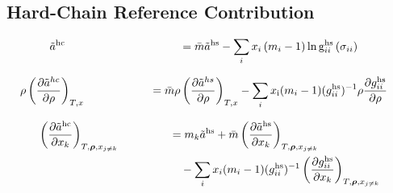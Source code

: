 \documentclass[12pt, letterpaper]{article}
\begin{document}
\subsection{Hard-Chain Reference Contribution}


\begin{equation}
    \begin{aligned}
        \mathmakebox[11.5em][l]{\tilde{a}^{\mathrm{hc}}}
        &=
        \bar{m} \tilde{a}^{\mathrm{hs}}
        -\sum_{i} x_{i}\left(m_{i}-1\right) \ln \mathrm{g}_{i i}^{\mathrm{hs}}\left(\sigma_{i i}\right)
    \end{aligned}
    \label{eq:ares_hc}
\end{equation}



\begin{equation}
    \begin{aligned}
        \mathmakebox[11.5em][l]{\rho\left(\frac{\partial\tilde{a}^{hc}}{\partial\rho}\right)_{T,x}}
        &=
        \bar{m}\rho\left(\frac{\partial\tilde{a}^{hs}}{\partial\rho}\right)_{T,x}
        -\sum_{i}x_{\mathrm{i}}(m_{i}-1)(g_{ii}^\mathrm{hs})^{-1}\rho\frac{\partial g_{ii}^\mathrm{hs}}{\partial\rho}
    \end{aligned}
    \label{eq:hc_ares_dadrho}
\end{equation}


\begin{equation}
    \begin{aligned}
        \mathmakebox[11.5em][l]{\left(\frac{\partial\tilde{a}^{\mathrm{hc}}}{\partial x_{k}}\right)_{T,\boldsymbol{\rho},x_{j\neq k}}}
        &=m_{k}\tilde{a}^{\mathrm{hs}}
        +\bar{m}\left(\frac{\partial\tilde{a}^{\mathrm{hs}}}{\partial x_{k}}\right)_{T,\boldsymbol{\rho},x_{j\neq k}}
        \\
        &\quad -\sum_{i}x_{i}(m_{i}-1)(g_{ii}^{\mathrm{hs}})^{-1}
        \left(\frac{\partial g_{ii}^{\mathrm{hs}}}{\partial x_{k}}\right)_{T,\boldsymbol{\rho},x_{j\neq k}}
    \end{aligned}
    \label{eq:hc_ares_dxk}
\end{equation}
\end{document}
